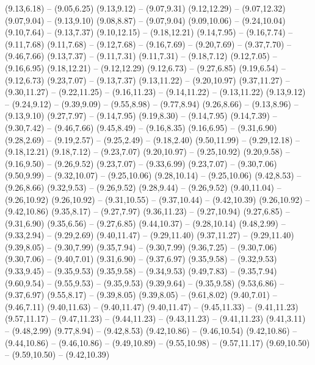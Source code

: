 {  (9.13,6.18) -- (9.05,6.25)
  (9.13,9.12) -- (9.07,9.31)
  (9.12,12.29) -- (9.07,12.32)
  (9.07,9.04) -- (9.13,9.10)
  (9.08,8.87) -- (9.07,9.04)
  (9.09,10.06) -- (9.24,10.04)
  (9.10,7.64) -- (9.13,7.37)
  (9.10,12.15) -- (9.18,12.21)
  (9.14,7.95) -- (9.16,7.74) -- (9.11,7.68)
  (9.11,7.68) -- (9.12,7.68) -- (9.16,7.69) -- (9.20,7.69) -- (9.37,7.70) -- (9.46,7.66)
  (9.13,7.37) -- (9.11,7.31)
  (9.11,7.31) -- (9.18,7.12)
  (9.12,7.05) -- (9.16,6.95)
  (9.18,12.21) -- (9.12,12.29)
  (9.12,6.73) -- (9.27,6.85)
  (9.19,6.54) -- (9.12,6.73)
  (9.23,7.07) -- (9.13,7.37)
  (9.13,11.22) -- (9.20,10.97)
  (9.37,11.27) -- (9.30,11.27) -- (9.22,11.25) -- (9.16,11.23) -- (9.14,11.22) -- (9.13,11.22)
  (9.13,9.12) -- (9.24,9.12) -- (9.39,9.09) -- (9.55,8.98) -- (9.77,8.94)
  (9.26,8.66) -- (9.13,8.96) -- (9.13,9.10)
  (9.27,7.97) -- (9.14,7.95)
  (9.19,8.30) -- (9.14,7.95)
  (9.14,7.39) -- (9.30,7.42) -- (9.46,7.66)
  (9.45,8.49) -- (9.16,8.35)
  (9.16,6.95) -- (9.31,6.90)
  (9.28,2.69) -- (9.19,2.57) -- (9.25,2.49) -- (9.18,2.40)
  (9.50,11.99) -- (9.29,12.18) -- (9.18,12.21)
  (9.18,7.12) -- (9.23,7.07)
  (9.20,10.97) -- (9.25,10.92)
  (9.20,9.58) -- (9.16,9.50) -- (9.26,9.52)
  (9.23,7.07) -- (9.33,6.99)
  (9.23,7.07) -- (9.30,7.06)
  (9.50,9.99) -- (9.32,10.07) -- (9.25,10.06)
  (9.28,10.14) -- (9.25,10.06)
  (9.42,8.53) -- (9.26,8.66)
  (9.32,9.53) -- (9.26,9.52)
  (9.28,9.44) -- (9.26,9.52)
  (9.40,11.04) -- (9.26,10.92)
  (9.26,10.92) -- (9.31,10.55) -- (9.37,10.44) -- (9.42,10.39)
  (9.26,10.92) -- (9.42,10.86)
  (9.35,8.17) -- (9.27,7.97)
  (9.36,11.23) -- (9.27,10.94)
  (9.27,6.85) -- (9.31,6.90)
  (9.35,6.56) -- (9.27,6.85)
  (9.44,10.37) -- (9.28,10.14)
  (9.48,2.99) -- (9.33,2.94) -- (9.29,2.69)
  (9.40,11.47) -- (9.29,11.40)
  (9.37,11.27) -- (9.29,11.40)
  (9.39,8.05) -- (9.30,7.99)
  (9.35,7.94) -- (9.30,7.99)
  (9.36,7.25) -- (9.30,7.06)
  (9.30,7.06) -- (9.40,7.01)
  (9.31,6.90) -- (9.37,6.97)
  (9.35,9.58) -- (9.32,9.53)
  (9.33,9.45) -- (9.35,9.53)
  (9.35,9.58) -- (9.34,9.53)
  (9.49,7.83) -- (9.35,7.94)
  (9.60,9.54) -- (9.55,9.53) -- (9.35,9.53)
  (9.39,9.64) -- (9.35,9.58)
  (9.53,6.86) -- (9.37,6.97)
  (9.55,8.17) -- (9.39,8.05)
  (9.39,8.05) -- (9.61,8.02)
  (9.40,7.01) -- (9.46,7.11)
  (9.40,11.63) -- (9.40,11.47)
  (9.40,11.47) -- (9.45,11.33) -- (9.41,11.23)
  (9.57,11.17) -- (9.47,11.23) -- (9.44,11.23) -- (9.43,11.23) -- (9.41,11.23)
  (9.41,3.11) -- (9.48,2.99)
  (9.77,8.94) -- (9.42,8.53)
  (9.42,10.86) -- (9.46,10.54)
  (9.42,10.86) -- (9.44,10.86) -- (9.46,10.86) -- (9.49,10.89) -- (9.55,10.98) -- (9.57,11.17)
  (9.69,10.50) -- (9.59,10.50) -- (9.42,10.39)
}
